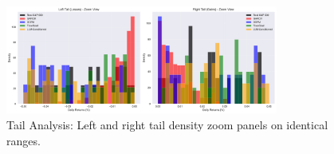\begin{figure}[htbp]
\centering
\includegraphics[width=0.8\textwidth]{figures/tail_analysis.pdf}
\caption{Tail Analysis: Left and right tail density zoom panels on identical ranges.}
\label{fig:tail_analysis}
\end{figure}